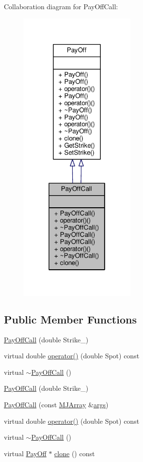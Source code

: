 Collaboration diagram for Pay\+Off\+Call\+:
\nopagebreak
\begin{figure}[H]
\begin{center}
\leavevmode
\includegraphics[width=166pt]{classPayOffCall__coll__graph}
\end{center}
\end{figure}
\subsection*{Public Member Functions}
\begin{DoxyCompactItemize}
\item 
\hyperlink{classPayOffCall_ac9f6304d62e33fbce6c2db1a82c312dc}{Pay\+Off\+Call} (double Strike\+\_\+)
\item 
virtual double \hyperlink{classPayOffCall_af6472a1bc2034da730d2375bf9750142}{operator()} (double Spot) const
\item 
virtual \hyperlink{classPayOffCall_a0cab46272abe31e91b04dd835ef0e7ee}{$\sim$\+Pay\+Off\+Call} ()
\item 
\hyperlink{classPayOffCall_ac9f6304d62e33fbce6c2db1a82c312dc}{Pay\+Off\+Call} (double Strike\+\_\+)
\item 
\hyperlink{classPayOffCall_ae68d6baed8d24536e64e90633d684a59}{Pay\+Off\+Call} (const \hyperlink{classMJArray}{M\+J\+Array} \&\hyperlink{path__generation_8h_a75c13cde2074f502cc4348c70528572d}{args})
\item 
virtual double \hyperlink{classPayOffCall_af6472a1bc2034da730d2375bf9750142}{operator()} (double Spot) const
\item 
virtual \hyperlink{classPayOffCall_a0cab46272abe31e91b04dd835ef0e7ee}{$\sim$\+Pay\+Off\+Call} ()
\item 
virtual \hyperlink{classPayOff}{Pay\+Off} $\ast$ \hyperlink{classPayOffCall_a3eb9cf318975edf458873f812b7e9138}{clone} () const
\end{DoxyCompactItemize}
